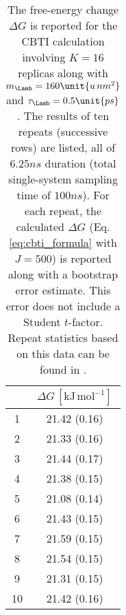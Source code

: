 %
\begin{table}[H]
  \centering
  \caption{\footnotesize{} The free-energy change $\Delta G$ is reported for the CBTI
    calculation involving $K=16$ replicas along with $m_{\Lamb}=160\unit{u\,nm^2}$  and $\tau_{\Lamb}=0.5\unit{ps}$.
    The results of ten repeats (successive rows) are listed, all of $6.25\unit{ns}$ duration (total
    single-system sampling time of $100\unit{ns}$).
    For each repeat, the calculated $\Delta G$ (Eq. \ref{eq:cbti_formula} with $J=500$) is reported along with a
    bootstrap error estimate. This error does not include a Student $t$-factor.
    Repeat statistics based on this data can be found in  .
  }
  \label{tab:cvbseed}
  \begin{tabular}{*{2}{c}}
\hline
    &       $\Delta G\,[\mathrm{kJ\,mol^{-1}}]$  \\
\hline
\hline
   1  &  21.42  (0.16)\\
   2  &  21.33  (0.16)\\
   3  &  21.44  (0.17)\\
   4  &  21.38  (0.15)\\
   5  &  21.08  (0.14)\\
   6  &  21.43  (0.15)\\
   7  &  21.59  (0.15)\\
   8  &  21.54  (0.15)\\
   9  &  21.31  (0.15)\\
  10  &  21.42  (0.16)\\
\end{tabular}
\end{table}
\clearpage




